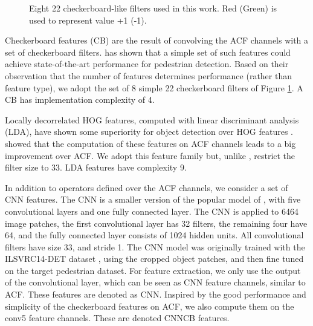 \documentclass[10pt,twocolumn,letterpaper]{article}
\begin{document}
\begin{figure}[!t]
\centering
\centerline{}
\caption{Eight 22 checkerboard-like filters used in this work.
  Red (Green) is used to represent value +1 (-1).}
\label{fig:checkerboard}
\end{figure}

\vspace{.05in}
Checkerboard features (CB) are the result of convolving the ACF channels
with a set of checkerboard filters. \cite{DBLP:journals/corr/ZhangBS15}
has shown that a simple set of such features could achieve state-of-the-art
performance for pedestrian detection. Based on their observation that the
number of features determines performance (rather than feature type), we
adopt the set of 8 simple 22 checkerboard filters of
Figure \ref{fig:checkerboard}. A CB has implementation complexity of 4.

\vspace{.05in}
Locally decorrelated HOG features, computed with linear discriminant
analysis (LDA), have shown some superiority for object detection over
HOG features \cite{DBLP:conf/eccv/HariharanMR12}.
\cite{DBLP:conf/nips/NamDH14} showed that the computation of these features
on ACF channels leads to a big improvement over ACF. We adopt this feature
family but, unlike \cite{DBLP:conf/nips/NamDH14}, restrict the filter
size to 33. LDA features have complexity 9.

\vspace{.05in}
In addition to operators defined over the ACF channels, we consider a set
of CNN features. The CNN is a smaller version of the popular model
of \cite{DBLP:conf/nips/KrizhevskySH12}, with five convolutional layers
and one fully connected layer. The CNN is applied to 6464 image
patches, the first convolutional layer has 32 filters, the remaining
four have 64, and the fully connected layer consists of 1024
hidden units. All convolutional filters have size 33, and
stride 1. The CNN model was originally trained with the ILSVRC14-DET
dataset \cite{ILSVRC15}, using the cropped object patches, and then fine
tuned on the target pedestrian dataset. For feature extraction, we only use
the output of the  convolutional layer, which can be seen as CNN
feature channels, similar to ACF. These features are denoted as CNN.
Inspired by the good performance and simplicity of the
checkerboard features on ACF, we also
compute them on the conv5 feature channels. These are denoted CNNCB features.
\end{document}
